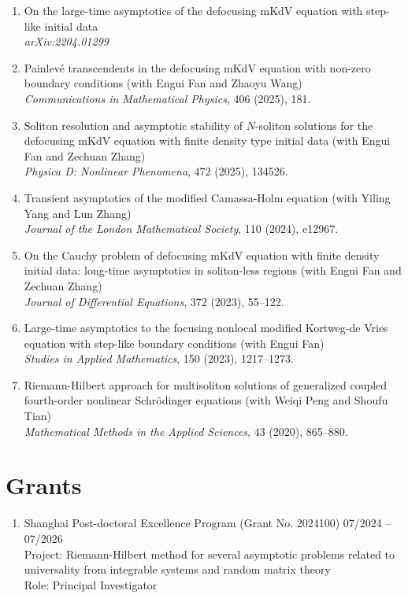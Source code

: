 \documentclass[margin]{res}
\begin{document}
\begin{resume}
\begin{enumerate}[1.]
    \item On the large-time asymptotics of the defocusing mKdV equation with step-like initial data \\
    {\sl arXiv:2204.01299}

    \item Painlev\'{e} transcendents in the defocusing mKdV equation with non-zero boundary conditions (with Engui Fan and Zhaoyu Wang)\\
    {\sl Communications in Mathematical Physics}, 406 (2025), 181.

    \item Soliton resolution and asymptotic stability of $N$-soliton solutions for the defocusing mKdV equation with finite density type initial data (with Engui Fan and Zechuan Zhang)\\ 
    {\sl Physica D: Nonlinear Phenomena}, 472 (2025), 134526. 

    \item Transient asymptotics of the modified Camassa-Holm equation (with Yiling Yang and Lun Zhang) \\
    {\sl Journal of the London Mathematical Society}, 110 (2024), e12967. 

    \item On the Cauchy problem of defocusing mKdV equation with finite density initial data: long-time asymptotics in soliton-less regions (with Engui Fan and Zechuan Zhang)\\
    {\sl Journal of Differential Equations}, 372 (2023), 55--122.

    \item Large-time asymptotics to the focusing nonlocal modified Kortweg-de Vries equation with step-like boundary conditions (with Engui Fan)\\
    {\sl Studies in Applied Mathematics}, 150 (2023), 1217--1273. 
    
    \item Riemann-Hilbert approach for multisoliton solutions of generalized coupled fourth-order nonlinear Schr\"odinger equations
    (with Weiqi Peng and Shoufu Tian)\\
    {\sl Mathematical Methods in the Applied Sciences}, 43 (2020), 865--880.
\end{enumerate}

\section{Grants}
\begin{enumerate}[--]
\item Shanghai Post-doctoral Excellence Program (Grant No. 2024100) \hfill 07/2024 -- 07/2026  \\
Project: Riemann-Hilbert method for several asymptotic problems related to universality from integrable systems and random matrix theory  \\
Role: Principal Investigator


\end{enumerate}
\end{resume}
\end{document}
